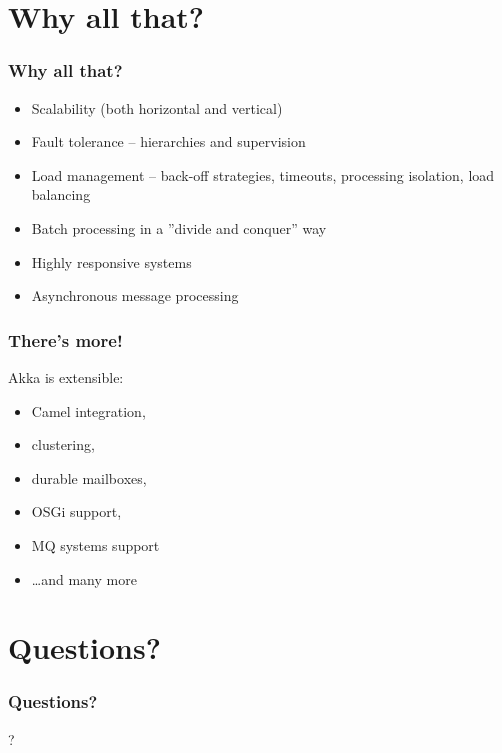 \documentclass[xcolor=dvipsnames]{beamer}
\begin{document}
\section{Why all that?}

\begin{frame}
\frametitle{Why all that?}
\begin{itemize}
\item Scalability (both horizontal and vertical)
\item Fault tolerance -- hierarchies and supervision
\item Load management -- back-off strategies, timeouts, processing isolation, load balancing
\item Batch processing in a ''divide and conquer'' way
\item Highly responsive systems
\item Asynchronous message processing
\end{itemize}
\end{frame}

\begin{frame}
\frametitle{There's more!}
Akka is extensible:
\begin{itemize}
\item Camel integration,
\item clustering,
\item durable mailboxes,
\item OSGi support,
\item MQ systems support
\item \ldots and many more
\end{itemize}
\end{frame}

\section{Questions?}

\begin{frame}
\frametitle{Questions?}
\begin{center}
\Huge{?}
\end{center}
\end{frame}
\end{document}

